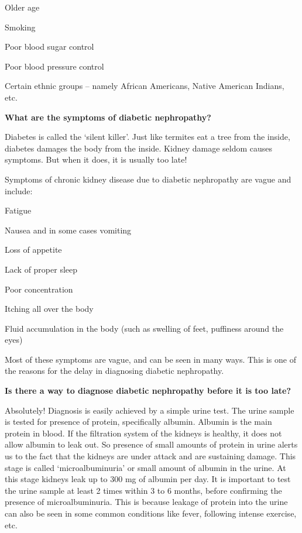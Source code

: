  \item Older age

 \item Smoking

 \item Poor blood sugar control

 \item Poor blood pressure control

 \item Certain ethnic groups – namely African Americans, Native American Indians, etc.

\textbf{What are the symptoms of diabetic nephropathy?}

Diabetes is called the ‘silent killer’. Just like termites eat a tree from the inside, diabetes damages the body from the inside. Kidney damage seldom causes symptoms. But when it does, it is usually too late!

Symptoms of chronic kidney disease due to diabetic nephropathy are vague and include:

\item Fatigue

 \item Nausea and in some cases vomiting

 \item Loss of appetite

 \item Lack of proper sleep

 \item Poor concentration

 \item Itching all over the body

 \item Fluid accumulation in the body (such as swelling of feet, puffiness around the eyes)

Most of these symptoms are vague, and can be seen in many ways. This is one of the reasons for the delay in diagnosing diabetic nephropathy.

\textbf{Is there a way to diagnose diabetic nephropathy before it is too late?}

Absolutely! Diagnosis is easily achieved by a simple urine test. The urine sample is tested for presence of protein, specifically albumin. Albumin is the main protein in blood. If the filtration system of the kidneys is healthy, it does not allow albumin to leak out. So presence of small amounts of protein in urine alerts us to the fact that the kidneys are under attack and are sustaining damage. This stage is called ‘microalbuminuria’ or small amount of albumin in the urine. At this stage kidneys leak up to 300 mg of albumin per day. It is important to test the urine sample at least 2 times within 3 to 6 months, before confirming the presence of microalbuminuria. This is because leakage of protein into the urine can also be seen in some common conditions like fever, following intense exercise, etc.

